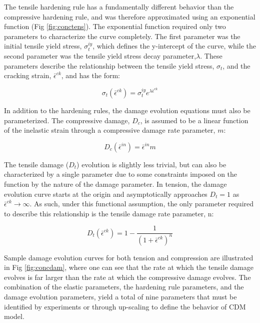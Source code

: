 The tensile hardening rule has a fundamentally different behavior
than the compressive hardening rule, and was therefore approximated
using an exponential function (Fig \ref{fig:conctens}). The exponential function required
only two parameters to characterize the curve completely. The first
parameter was the initial tensile yield stress, $\sigma_{t}^{iy}$,
which defines the y-intercept of the curve, while the second parameter
was the tensile yield stress decay parameter,$\lambda$. These parameters
describe the relationship between the tensile yield stress, $\sigma_{t}$,
and the cracking strain, $\bar{\epsilon}^{ck}$, and has the form:

\begin{equation}
\sigma_{t}\left(\bar{\epsilon}^{ck}\right)=\sigma_{t}^{iy}e^{\lambda\bar{\epsilon}^{ck}}\label{eqn:param2}
\end{equation}


In addition to the hardening rules, the damage evolution equations must also be parameterized. The compressive damage, $D_c$, is assumed to be a linear function of the inelastic strain through a compressive damage rate parameter, $m$:

\begin{equation}
D_{c}\left(\bar{\epsilon}^{in}\right)=\bar{\epsilon}^{in}m\label{eqn:param3}
\end{equation}


The tensile damage ($D_{t}$) evolution is slightly less trivial,
but can also be characterized by a single parameter due to some constraints
imposed on the function by the nature of the damage parameter. In
tension, the damage evolution curve starts at the origin and asymptotically
approaches $D_{t}=1$ as $\bar{\epsilon}^{ck}\rightarrow\infty$.
As such, under this functional assumption, the only parameter required
to describe this relationship is the tensile damage rate parameter,
n:

\begin{equation}
D_{t}\left(\bar{\epsilon}^{ck}\right)=1-\frac{1}{\left(1+\bar{\epsilon}^{ck}\right)^{n}}\label{eqn:param4}
\end{equation}


Sample damage evolution curves for both tension and compression are
illustrated in Fig \ref{fig:concdam}, where one can see that the rate at which the
tensile damage evolves is far larger than the rate at which the compressive
damage evolves. The combination of the elastic parameters, the hardening
rule parameters, and the damage evolution parameters, yield a total
of nine parameters that must be identified by experiments or through
up-scaling to define the behavior of CDM model.

